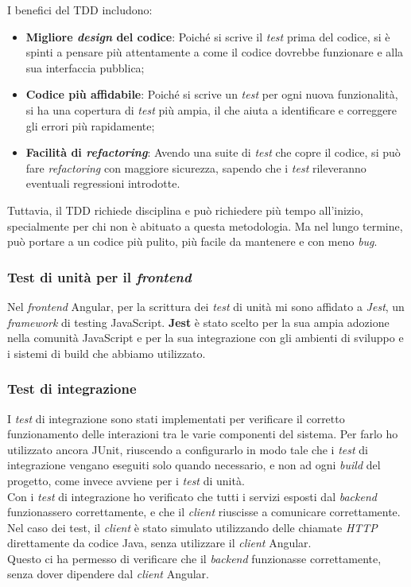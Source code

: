 I benefici del TDD includono:
\begin{itemize}
  \item \textbf{Migliore \textit{design} del codice}: Poiché si scrive il \textit{test} prima del codice, si è spinti a pensare più attentamente a come il codice dovrebbe funzionare e alla sua interfaccia pubblica;
  \item \textbf{Codice più affidabile}: Poiché si scrive un \textit{test} per ogni nuova funzionalità, si ha una copertura di \textit{test} più ampia, il che aiuta a identificare e correggere gli errori più rapidamente;
  \item \textbf{Facilità di \textit{refactoring}}: Avendo una suite di \textit{test} che copre il codice, si può fare \textit{refactoring} con maggiore sicurezza, sapendo che i \textit{test} rileveranno eventuali regressioni introdotte.
\end{itemize}

Tuttavia, il TDD richiede disciplina e può richiedere più tempo all'inizio, 
specialmente per chi non è abituato a questa metodologia. 
Ma nel lungo termine, può portare a un codice più pulito, più facile da mantenere e con meno \textit{bug}.

\subsubsection{Test di unità per il \textit{frontend}}
Nel \textit{frontend} Angular, per la scrittura dei \textit{test} di unità mi sono affidato a \textit{Jest}, 
un \textit{framework} di testing JavaScript.
\textbf{Jest} è stato scelto per la sua ampia adozione nella comunità JavaScript 
e per la sua integrazione con gli ambienti di sviluppo e i sistemi di build che abbiamo utilizzato. 

\subsubsection*{Test di integrazione}
I \textit{test} di integrazione sono stati implementati per verificare il corretto funzionamento 
delle interazioni tra le varie componenti del sistema.
Per farlo ho utilizzato ancora JUnit, riuscendo a configurarlo in modo tale che
i \textit{test} di integrazione vengano eseguiti solo quando necessario, 
e non ad ogni \textit{build} del progetto, come invece avviene per i \textit{test} di unità.\\

Con i \textit{test} di integrazione ho verificato che tutti i servizi esposti dal \textit{backend} funzionassero correttamente,
e che il \textit{client} riuscisse a comunicare correttamente.
Nel caso dei test, il \textit{client} è stato simulato utilizzando delle chiamate \textit{HTTP} 
direttamente da codice Java, senza utilizzare il \textit{client} Angular.\\
Questo ci ha permesso di verificare che il \textit{backend} funzionasse correttamente,
senza dover dipendere dal \textit{client} Angular.

